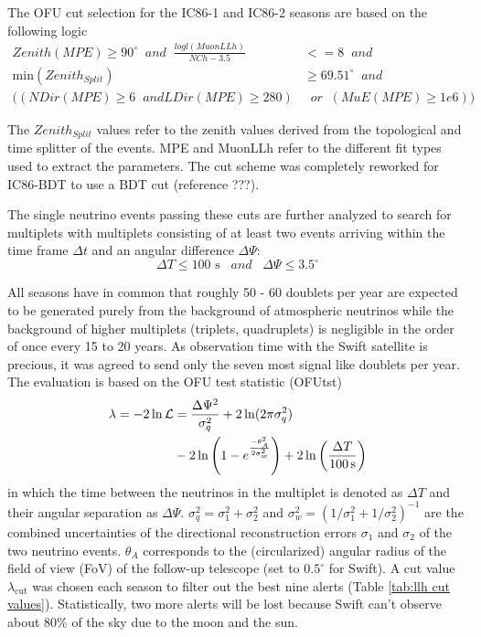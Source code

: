 The OFU cut selection for the IC86-1 and IC86-2 seasons are based on the 
following logic
\begin{equation}
\begin{align}
Zenith (MPE) \geq 90^\circ \; \; and \; \; \frac{logl (MuonLLh)}{NCh - 3.5} & 
<= 8 \; \; and \\ \text{min} (Zenith_{Split}) &\geq 69.51^\circ \; 
\; and \\
((NDir (MPE) \geq 6 \; \;
and LDir (MPE) \geq 280 )& \; \;or \; \;(MuE (MPE) \geq 1e6))
\end{align}
\end{equation}

The $Zenith_{Split}$ values refer to the 
zenith values derived from the topological and time splitter of the events. MPE 
and MuonLLh refer to the different fit types used to extract the parameters. 
The cut scheme was completely reworked  for IC86-BDT to use a BDT cut 
(reference ???). 

The single neutrino events passing these cuts are further analyzed to search 
for multiplets with multiplets consisting of at least two events arriving 
within the time frame $\Delta t$ and an angular difference $\Delta \Psi$:
\begin{equation}
 \Delta T \leq 100 \text{ s} \;\;\; and \;\;\; \Delta \Psi \leq 3.5^\circ
\end{equation}

All seasons have in common that roughly 50 - 60  doublets per 
year are expected to be generated purely from the background of atmospheric 
neutrinos while the background of higher multiplets (triplets, quadruplets) is 
negligible in the order of once every 15 to 20 years. As observation time with 
the Swift satellite is precious, it was agreed to send only the seven most 
signal like doublets per year. The evaluation is based on the OFU test 
statistic (OFUtst)
\begin{align}
    \begin{split}
    \lambda = -2 \ln \mathcal{L} &= \frac{\Delta\Psi^2}{\sigma_q^2} + 2 \ln(2
\pi \sigma_q^2) \\
                              &- 2 \ln\left( 1 -
e^{\frac{-\theta_A^2}{2\sigma_w^2}}\right) 
                              + 2 \ln\left( \frac{\Delta T}{\unit[100]{s}}
\right)
    \end{split}
  \label{eq:alert-llh}
\end{align}
in which the time between the neutrinos in the multiplet is denoted as $\Delta 
T$
and their angular separation as $\Delta\Psi$. $\sigma_q^2 = \sigma_1^2 +
\sigma_2^2$ and $\sigma_w^2 = \left(1/\sigma_1^2 + 1/\sigma_2^2\right)^{-1}$
 are the combined uncertainties of the directional
reconstruction errors $\sigma_1$ and $\sigma_2$ of the two neutrino events.
$\theta_A$ corresponds to the (circularized) angular radius of the field
of view (FoV) of the follow-up telescope (set to $0.5^\circ$ for Swift). A cut 
value $\lambda_\text{cut}$ was chosen each season to filter out the best nine 
alerts (Table \ref{tab:llh cut values}). Statistically, two more alerts will be 
lost because Swift can't observe about 80\% of the sky due to the moon and the 
sun.

